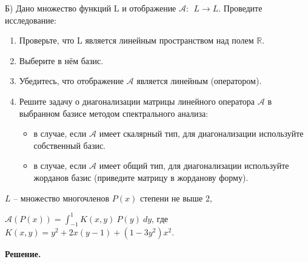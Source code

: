Б) Дано множество функций L и отображение  $\mathcal{A}:\ \ L\rightarrow L$.
Проведите исследование:
\begin{enumerate}
    \item Проверьте, что L является линейным пространством над полем $\mathbb{R}$.
    \item Выберите в нём базис.
    \item Убедитесь, что отображение $\mathcal{A}$ является линейным (оператором).
    \item Решите задачу о диагонализации матрицы линейного оператора $\mathcal{A}$ в выбранном базисе методом спектрального анализа:
    \begin{itemize}
        \item в случае, если $\mathcal{A}$ имеет скалярный тип, для диагонализации используйте собственный базис.
        \item в случае, если $\mathcal{A}$ имеет общий тип, для диагонализации используйте жорданов базис (приведите матрицу в жорданову форму).
    \end{itemize}
\end{enumerate}

$L$ – множество многочленов $P\left(x\right)$ степени не выше 2,

$\displaystyle \mathcal{A}\left(P\left(x\right)\right)=\int_{-1}^{1}{K\left(x,y\right)\ P\left(y\right)\ dy}$, где $K\left(x,y\right)=y^2+2x\left(y-1\right)+\left(1-3y^2\right)x^2$.

\vspace{10mm}

\textbf{Решение.}

